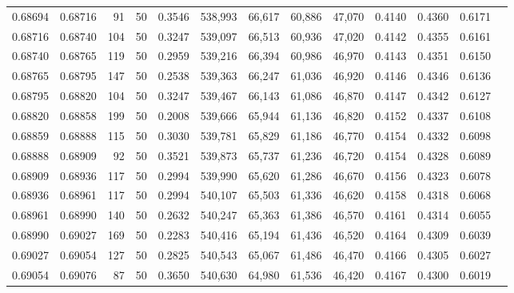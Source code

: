\begin{tabular}{rrrrrrrrrrrrr}
0.68694 & 0.68716 &    91 &  50 &                                     0.3546 & 538,993 &  66,617 &  60,886 &  47,070 & 0.4140 & 0.4360 & 0.6171 \\
0.68716 & 0.68740 &   104 &  50 &                                     0.3247 & 539,097 &  66,513 &  60,936 &  47,020 & 0.4142 & 0.4355 & 0.6161 \\
0.68740 & 0.68765 &   119 &  50 &                                     0.2959 & 539,216 &  66,394 &  60,986 &  46,970 & 0.4143 & 0.4351 & 0.6150 \\
0.68765 & 0.68795 &   147 &  50 &                                     0.2538 & 539,363 &  66,247 &  61,036 &  46,920 & 0.4146 & 0.4346 & 0.6136 \\
0.68795 & 0.68820 &   104 &  50 &                                     0.3247 & 539,467 &  66,143 &  61,086 &  46,870 & 0.4147 & 0.4342 & 0.6127 \\
0.68820 & 0.68858 &   199 &  50 &                                     0.2008 & 539,666 &  65,944 &  61,136 &  46,820 & 0.4152 & 0.4337 & 0.6108 \\
0.68859 & 0.68888 &   115 &  50 &                                     0.3030 & 539,781 &  65,829 &  61,186 &  46,770 & 0.4154 & 0.4332 & 0.6098 \\
0.68888 & 0.68909 &    92 &  50 &                                     0.3521 & 539,873 &  65,737 &  61,236 &  46,720 & 0.4154 & 0.4328 & 0.6089 \\
0.68909 & 0.68936 &   117 &  50 &                                     0.2994 & 539,990 &  65,620 &  61,286 &  46,670 & 0.4156 & 0.4323 & 0.6078 \\
0.68936 & 0.68961 &   117 &  50 &                                     0.2994 & 540,107 &  65,503 &  61,336 &  46,620 & 0.4158 & 0.4318 & 0.6068 \\
0.68961 & 0.68990 &   140 &  50 &                                     0.2632 & 540,247 &  65,363 &  61,386 &  46,570 & 0.4161 & 0.4314 & 0.6055 \\
0.68990 & 0.69027 &   169 &  50 &                                     0.2283 & 540,416 &  65,194 &  61,436 &  46,520 & 0.4164 & 0.4309 & 0.6039 \\
0.69027 & 0.69054 &   127 &  50 &                                     0.2825 & 540,543 &  65,067 &  61,486 &  46,470 & 0.4166 & 0.4305 & 0.6027 \\
0.69054 & 0.69076 &    87 &  50 &                                     0.3650 & 540,630 &  64,980 &  61,536 &  46,420 & 0.4167 & 0.4300 & 0.6019 \\

\end{tabular}
